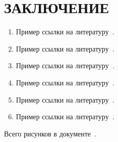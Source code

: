 \chapter*{ЗАКЛЮЧЕНИЕ}

\begin{enumerate}
\item Пример ссылки на литературу~\cite{bookexample}.
\item Пример ссылки на литературу~\cite{book1author}.
\item Пример ссылки на литературу~\cite{book5author}.
\item Пример ссылки на литературу~\cite{wikiRUBitbucket}.
\item Пример ссылки на литературу~\cite{wikiRUGitHub}.
\item Пример ссылки на литературу~\cite{wikiRUIdSoftware}.
\end{enumerate}

Всего рисунков в документе~\totalfigures.